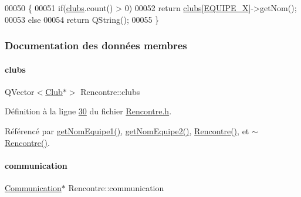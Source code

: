 \begin{DoxyCode}
00050 \{
00051     \textcolor{keywordflow}{if}(\hyperlink{class_rencontre_a12f6cef62070ecb095971e704a9d92a6}{clubs}.count() > 0)
00052         \textcolor{keywordflow}{return} \hyperlink{class_rencontre_a12f6cef62070ecb095971e704a9d92a6}{clubs}[\hyperlink{_rencontre_8h_abee6bce8b9cc687177c72a76428afcff}{EQUIPE\_X}]->getNom();
00053     \textcolor{keywordflow}{else}
00054         \textcolor{keywordflow}{return} QString();
00055 \}
\end{DoxyCode}


\subsubsection{Documentation des données membres}
\mbox{\label{class_rencontre_a12f6cef62070ecb095971e704a9d92a6}} 
\paragraph{\texorpdfstring{clubs}{clubs}}
{\footnotesize\ttfamily Q\+Vector$<$\hyperlink{class_club}{Club}$\ast$$>$ Rencontre\+::clubs\hspace{0.3cm}{\ttfamily [private]}}



Définition à la ligne \hyperlink{_rencontre_8h_source_l00030}{30} du fichier \hyperlink{_rencontre_8h_source}{Rencontre.\+h}.



Référencé par \hyperlink{_rencontre_8cpp_source_l00041}{get\+Nom\+Equipe1()}, \hyperlink{_rencontre_8cpp_source_l00049}{get\+Nom\+Equipe2()}, \hyperlink{_rencontre_8cpp_source_l00015}{Rencontre()}, et \hyperlink{_rencontre_8cpp_source_l00022}{$\sim$\+Rencontre()}.

\mbox{\label{class_rencontre_a843a1b93c1cb909f2706c6f81438661e}} 
\paragraph{\texorpdfstring{communication}{communication}}
{\footnotesize\ttfamily \hyperlink{class_communication}{Communication}$\ast$ Rencontre\+::communication\hspace{0.3cm}{\ttfamily [private]}}



